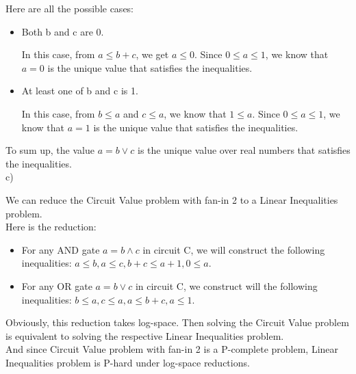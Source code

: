 \documentclass[12pt]{article}
\begin{document}
Here are all the possible cases:

\begin{itemize}
\item Both b and c are 0.

  In this case, from $a \le b + c$, we get $a \le 0$. Since $0 \le
  a \le 1$, we know that $a = 0$ is the unique value that satisfies
  the inequalities.
\item At least one of b and c is 1.

  In this case, from $b \le a$ and $c \le a$, we know that $1 \le
  a$. Since $0 \le a \le 1$, we know that $a = 1$ is the unique value
  that satisfies the inequalities.
\end{itemize}

To sum up, the value $a = b \lor c$ is the unique value over real
numbers that satisfies the inequalities. \\

c)

We can reduce the Circuit Value problem with fan-in 2 to a Linear
Inequalities problem. \\

Here is the reduction: 

\begin{itemize}
\item For any AND gate $a = b \land c$ in circuit C, we will construct
  the following inequalities: $a \le b, a \le c, b + c \le a + 1, 0
  \le a$.
\item For any OR gate $a = b \lor c$ in circuit C, we construct will
  the following inequalities: $b \le a, c \le a, a \le b + c, a \le 1$.
\end{itemize}

Obviously, this reduction takes log-space. Then solving the Circuit
Value problem is equivalent to solving the respective Linear
Inequalities problem. \\

And since Circuit Value problem with fan-in 2 is a P-complete problem,
Linear Inequalities problem is P-hard under log-space reductions.
\end{document}
